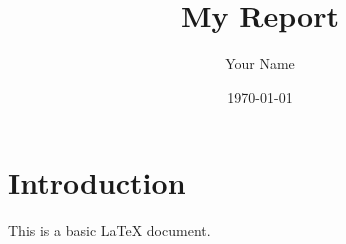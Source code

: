 \documentclass{article}
\title{My Report}
\author{Your Name}
\date{\today}
\begin{document}
\maketitle

\section{Introduction}
This is a basic LaTeX document.
\end{document}
